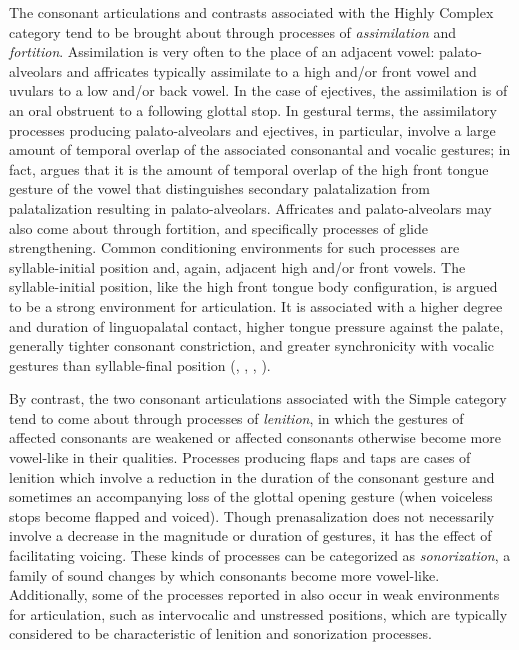   The consonant articulations and contrasts associated with the Highly Complex category tend to be brought about through processes of \textit{assimilation} and \textit{fortition}. Assimilation is very often to the place of an adjacent vowel: palato-alveolars and affricates typically assimilate to a high and/or front vowel and uvulars to a low and/or back vowel. In the case of ejectives, the assimilation is of an oral obstruent to a following glottal stop. In gestural terms, the assimilatory processes producing palato-alveolars and ejectives, in particular, involve a large amount of temporal overlap of the associated consonantal and vocalic gestures; in fact, \citet{Bateman2007} argues that it is the amount of temporal overlap of the high front tongue gesture of the vowel that distinguishes secondary palatalization from palatalization resulting in palato-alveolars. Affricates and palato-alveolars may also come about through fortition, and specifically processes of glide strengthening. Common conditioning environments for such processes are syllable-initial position and, again, adjacent high and/or front vowels. The syllable-initial position, like the high front tongue body configuration, is argued to be a strong environment for articulation. It is associated with a higher degree and duration of linguopalatal contact, higher tongue pressure against the palate, generally tighter consonant constriction, and greater synchronicity with vocalic gestures than syllable-final position (\citealt{Byrd1996b}, \citealt{Fougeron1999}, \citealt{KeatingEtAl2003}, \citealt{GoldsteinEtAl2006}).

  By contrast, the two consonant articulations associated with the Simple category tend to come about through processes of \textit{lenition}, in which the gestures of affected consonants are weakened or affected consonants otherwise become more vowel-like in their qualities. Processes producing flaps and taps are cases of lenition which involve a reduction in the duration of the consonant gesture and sometimes an accompanying loss of the glottal opening gesture (when voiceless stops become flapped and voiced). Though prenasalization does not necessarily involve a decrease in the magnitude or duration of gestures, it has the effect of facilitating voicing. These kinds of processes can be categorized as \textit{sonorization}, a family of sound changes by which consonants become more vowel-like. Additionally, some of the processes reported in  also occur in weak environments for articulation, such as intervocalic and unstressed positions, which are typically considered to be characteristic of lenition and sonorization processes.

